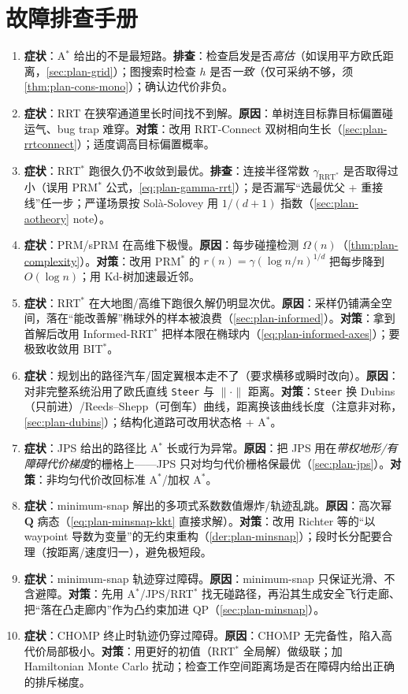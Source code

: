 \section*{故障排查手册}
\begin{enumerate}
  \item \textbf{症状}：A$^*$ 给出的不是最短路。\textbf{排查}：检查启发是否\emph{高估}（如误用平方欧氏距离，\cref{sec:plan-grid}）；图搜索时检查 $h$ 是否\emph{一致}（仅可采纳不够，须 \cref{thm:plan-cons-mono}）；确认边代价非负。
  \item \textbf{症状}：RRT 在狭窄通道里长时间找不到解。\textbf{原因}：单树连目标靠目标偏置碰运气、bug trap 难穿。\textbf{对策}：改用 RRT-Connect 双树相向生长（\cref{sec:plan-rrtconnect}）；适度调高目标偏置概率。
  \item \textbf{症状}：RRT$^*$ 跑很久仍不收敛到最优。\textbf{排查}：连接半径常数 $\gamma_{\mathrm{RRT}^*}$ 是否取得过小（误用 PRM$^*$ 公式，\cref{eq:plan-gamma-rrt}）；是否漏写“选最优父 + 重接线”任一步；严谨场景按 Solà-Solovey 用 $1/(d+1)$ 指数（\cref{sec:plan-aotheory} note）。
  \item \textbf{症状}：PRM/sPRM 在高维下极慢。\textbf{原因}：每步碰撞检测 $\Omega(n)$（\cref{thm:plan-complexity}）。\textbf{对策}：改用 PRM$^*$ 的 $r(n)=\gamma(\log n/n)^{1/d}$ 把每步降到 $O(\log n)$；用 Kd-树加速最近邻。
  \item \textbf{症状}：RRT$^*$ 在大地图/高维下跑很久解仍明显次优。\textbf{原因}：采样仍铺满全空间，落在“能改善解”椭球外的样本被浪费（\cref{sec:plan-informed}）。\textbf{对策}：拿到首解后改用 Informed-RRT$^*$ 把样本限在椭球内（\cref{eq:plan-informed-axes}）；要极致收敛用 BIT$^*$。
  \item \textbf{症状}：规划出的路径汽车/固定翼根本走不了（要求横移或瞬时改向）。\textbf{原因}：对非完整系统沿用了欧氏直线 \texttt{Steer} 与 $\|\cdot\|$ 距离。\textbf{对策}：\texttt{Steer} 换 Dubins（只前进）/Reeds--Shepp（可倒车）曲线，距离换该曲线长度（注意非对称，\cref{sec:plan-dubins}）；结构化道路可改用状态格 + A$^*$。
  \item \textbf{症状}：JPS 给出的路径比 A$^*$ 长或行为异常。\textbf{原因}：把 JPS 用在\emph{带权地形/有障碍代价梯度}的栅格上——JPS 只对均匀代价栅格保最优（\cref{sec:plan-jps}）。\textbf{对策}：非均匀代价改回标准 A$^*$/加权 A$^*$。
  \item \textbf{症状}：minimum-snap 解出的多项式系数数值爆炸/轨迹乱跳。\textbf{原因}：高次幂 $\mathbf{Q}$ 病态（\cref{eq:plan-minsnap-kkt} 直接求解）。\textbf{对策}：改用 Richter 等的“以 waypoint 导数为变量”的无约束重构（\cref{der:plan-minsnap}）；段时长分配要合理（按距离/速度归一），避免极短段。
  \item \textbf{症状}：minimum-snap 轨迹穿过障碍。\textbf{原因}：minimum-snap 只保证光滑、不含避障。\textbf{对策}：先用 A$^*$/JPS/RRT$^*$ 找无碰路径，再沿其生成安全飞行走廊、把“落在凸走廊内”作为凸约束加进 QP（\cref{sec:plan-minsnap}）。
  \item \textbf{症状}：CHOMP 终止时轨迹仍穿过障碍。\textbf{原因}：CHOMP 无完备性，陷入高代价局部极小。\textbf{对策}：用更好的初值（RRT$^*$ 全局解）做级联；加 Hamiltonian Monte Carlo 扰动；检查工作空间距离场是否在障碍内给出正确的排斥梯度。
\end{enumerate}
